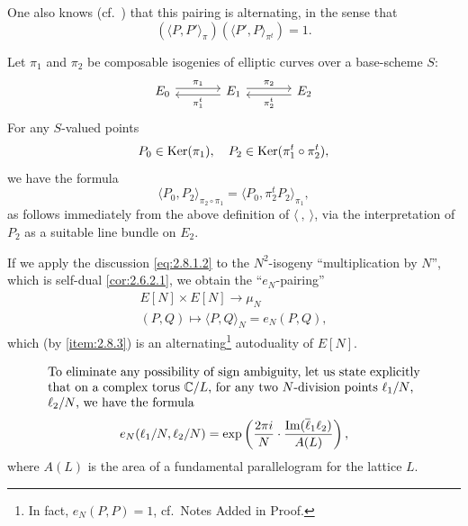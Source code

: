 \kmitem\label{item:2.8.3}
One also knows (cf.~\cite{Oda}) that this pairing is alternating, in the sense that
\[
(\langle P, P' \rangle_\pi)(\langle P', P \rangle_{\pi^t}) = 1.
\]

\kmitem\label{item:2.8.4}
Let $\pi_1$ and $\pi_2$ be composable isogenies of elliptic curves over a base-scheme $S$:
\[
\begin{tikzcd}[column sep=large]
  E_0 \arrow[r, shift left=0.6ex, "\pi_1"] & E_1 \arrow[l, shift left=0.6ex, "\pi_1^t"] \arrow[r, shift left=0.6ex, "\pi_2"] & E_2 \arrow[l, shift left=0.6ex, "\pi_2^t"]
\end{tikzcd}
\]
For any $S$-valued points
\[
P_0 \in \operatorname{Ker}(\pi_1), \quad P_2 \in \operatorname{Ker}(\pi_1^t \circ \pi_2^t),
\]
we have the formula
\begin{equation}\label{eq:2.8.4.1}
\langle P_0, P_2 \rangle_{\pi_2 \circ \pi_1} = \langle P_0, \pi_2^t P_2 \rangle_{\pi_1},
\end{equation}
as follows immediately from the above definition of $\langle\ ,\ \rangle$, via the interpretation of $P_2$ as a suitable line bundle on $E_2$.

\kmitem\label{item:2.8.5}
If we apply the discussion \ref{eq:2.8.1.2} to the $N^2$-isogeny ``multiplication by $N$'', which is self-dual \eqref{cor:2.6.2.1}, we obtain the ``$e_N$-pairing''
\begin{equation}\label{eq:2.8.5.1}
\begin{gathered}
E[N] \times E[N] \longrightarrow \mu_N \\
(P, Q) \longmapsto \langle P, Q \rangle_N = e_N(P, Q),
\end{gathered}
\end{equation}
which (by \ref{item:2.8.3}) is an alternating\footnote{In fact, $e_N(P,P) = 1$, cf.\ Notes Added in Proof.} autoduality of $E[N]$.

\begin{equation}\label{eq:2.8.5.2}
\parbox[t]{0.86\linewidth}{\raggedright To eliminate any possibility of sign ambiguity, let us state explicitly that on a complex torus $\C/L$, for any two $N$-division points $\ell_1/N$, $\ell_2/N$, we have the formula}
\end{equation}
\begin{equation}\label{eq:2.8.5.3}
e_N(\ell_1/N, \ell_2/N) = \exp\left(\frac{2\pi i}{N} \cdot \frac{\operatorname{Im}(\overline{\ell}_1 \ell_2)}{A(L)}\right),
\end{equation}
where $A(L)$ is the area of a fundamental parallelogram for the lattice $L$.

